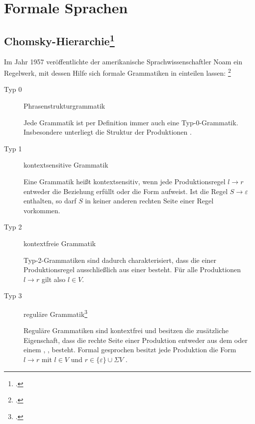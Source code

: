 \documentclass{bschlangaul-theorie}
\begin{document}
\chapter{Formale Sprachen}

\section{Chomsky-Hierarchie\footcite{wiki:chomsky}}

Im Jahr 1957 veröffentlichte der amerikanische Sprachwissenschaftler
Noam  ein Regelwerk, mit dessen Hilfe sich formale
Grammatiken in  einteilen lassen:
\footcite[Seite 168]{hoffmann}

\begin{description}
\item[Typ 0] Phrasenstrukturgrammatik

Jede Grammatik ist per Definition immer auch eine Typ-0-Grammatik.
Insbesondere unterliegt die Struktur der Produktionen .

\item[Typ 1] kontextsensitive Grammatik

Eine Grammatik heißt kontextsensitiv, wenn jede Produktionsregel $l
\rightarrow r$ entweder die Beziehung  erfüllt
oder die Form  aufweist. Ist die Regel
$S \rightarrow \varepsilon$ enthalten, so darf $S$ in keiner anderen
rechten Seite einer Regel vorkommen.

\item[Typ 2] kontextfreie Grammatik

Typ-2-Grammatiken sind dadurch charakterisiert, dass die  einer Produktionsregel ausschließlich aus einer  besteht. Für alle Produktionen $l \rightarrow r$ gilt also $l
\in V$.

\item[Typ 3] reguläre Grammatik\footcite[Seite 14]{theo:fs:1}

Reguläre Grammatiken sind kontextfrei und besitzen die zusätzliche
Eigenschaft, dass die rechte Seite einer Produktion entweder aus dem
 oder einem ,
, besteht. Formal gesprochen
besitzt jede Produktion die Form $l \rightarrow r$ mit $l \in V$ und $r
\in \{ \varepsilon \} \cup \Sigma V$ .
\end{description}
\end{document}
